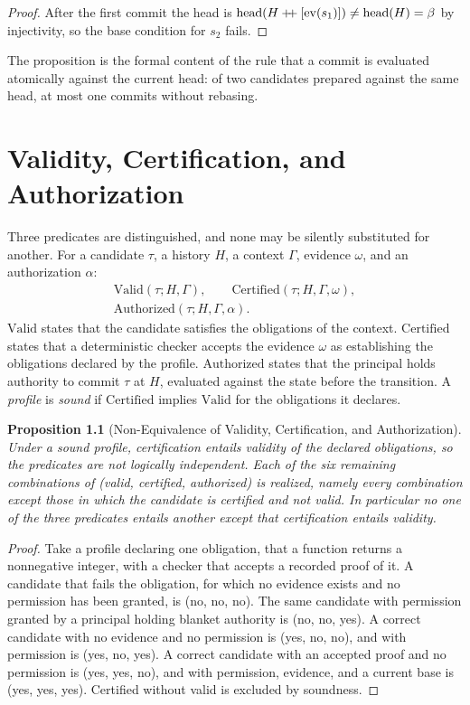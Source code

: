 \documentclass[12pt,oneside,openany]{book}
\theoremstyle{spherepop}
\newtheorem{proposition}[definition]{Proposition}
\theoremstyle{remarkstyle}
\newcommand{\hconcat}{\mathbin{+\mkern-5mu+}}
\begin{document}
\begin{proof}
After the first commit the head is $\mathrm{head}(H\hconcat[\mathrm{ev}(s_1)])\ne\mathrm{head}(H)=\beta$ by injectivity, so the base condition for $s_2$ fails.
\end{proof}

The proposition is the formal content of the rule that a commit is evaluated atomically against the current head: of two candidates prepared against the same head, at most one commits without rebasing.

\chapter{Validity, Certification, and Authorization}
\label{ch:vca}

Three predicates are distinguished, and none may be silently substituted for another. For a candidate $\tau$, a history $H$, a context $\Gamma$, evidence $\omega$, and an authorization $\alpha$:
\[
\begin{gathered}\mathrm{Valid}(\tau;H,\Gamma),\qquad\mathrm{Certified}(\tau;H,\Gamma,\omega),\\\mathrm{Authorized}(\tau;H,\Gamma,\alpha).\end{gathered}
\]
$\mathrm{Valid}$ states that the candidate satisfies the obligations of the context. $\mathrm{Certified}$ states that a deterministic checker accepts the evidence $\omega$ as establishing the obligations declared by the profile. $\mathrm{Authorized}$ states that the principal holds authority to commit $\tau$ at $H$, evaluated against the state before the transition. A \emph{profile} is \emph{sound} if $\mathrm{Certified}$ implies $\mathrm{Valid}$ for the obligations it declares.

\begin{proposition}[Non-Equivalence of Validity, Certification, and Authorization]
\label{prop:independence}
Under a sound profile, certification entails validity of the declared obligations, so the predicates are not logically independent. Each of the six remaining combinations of (valid, certified, authorized) is realized, namely every combination except those in which the candidate is certified and not valid. In particular no one of the three predicates entails another except that certification entails validity.
\end{proposition}

\begin{proof}
Take a profile declaring one obligation, that a function returns a nonnegative integer, with a checker that accepts a recorded proof of it. A candidate that fails the obligation, for which no evidence exists and no permission has been granted, is (no, no, no). The same candidate with permission granted by a principal holding blanket authority is (no, no, yes). A correct candidate with no evidence and no permission is (yes, no, no), and with permission is (yes, no, yes). A correct candidate with an accepted proof and no permission is (yes, yes, no), and with permission, evidence, and a current base is (yes, yes, yes). Certified without valid is excluded by soundness.
\end{proof}
\end{document}
